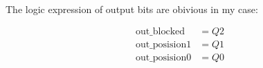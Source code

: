\begin{multicols}{2}
\begin{align*}
        \end{align*}
        \columnbreak
    \end{multicols}

\newpage

\noindent
The logic expression of output bits are obivious in my case:

\begin{align*}
    \text{out\_blocked} &=  Q2 \\
    \text{out\_posision1} &= Q1 \\
    \text{out\_posision0} &= Q0
\end{align*}


\newpage
